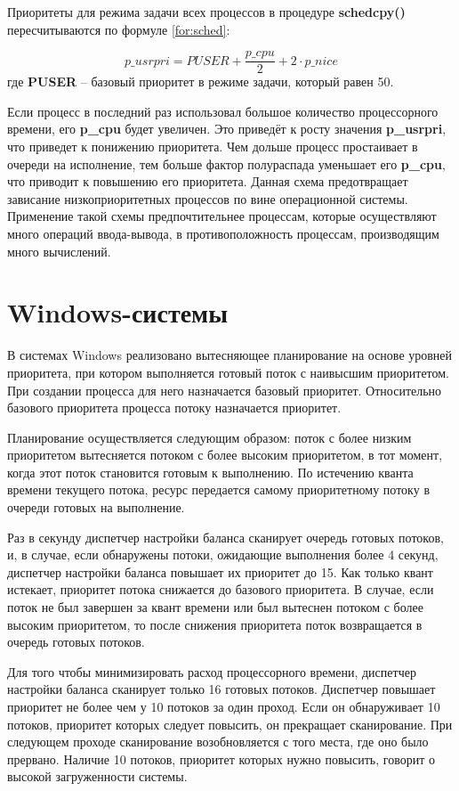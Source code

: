 \documentclass[a4paper,12pt]{extreport}
\begin{document}
Приоритеты для режима задачи всех процессов в процедуре \textbf{schedcpy()} пересчитываются по формуле \eqref{for:sched}:

\begin{equation}
	\label{for:sched}
	p\_usrpri = PUSER + \frac{p\_cpu}{2} + 2 \cdot p\_nice
\end{equation}
где \textbf{PUSER} -- базовый приоритет в режиме задачи, который равен 50.

Если процесс в последний раз использовал большое количество процессорного времени, его \textbf{p\_cpu} будет увеличен. Это приведёт к росту значения \textbf{p\_usrpri}, что приведет к понижению приоритета. Чем дольше процесс простаивает в очереди на исполнение, тем больше фактор полураспада уменьшает его \textbf{p\_cpu}, что приводит к повышению его приоритета. Данная схема предотвращает зависание низкоприоритетных процессов по вине операционной системы. Применение такой схемы предпочтительнее процессам, которые осуществляют много операций ввода-вывода, в противоположность процессам, производящим много вычислений.


\section{Windows-системы}

В системах Windows реализовано вытесняющее планирование на основе уровней приоритета, при котором выполняется готовый поток с наивысшим приоритетом. При создании процесса для него назначается базовый приоритет. Относительно базового приоритета процесса потоку назначается приоритет.

Планирование осуществляется следующим образом: поток с более низким приоритетом вытесняется потоком с более высоким приоритетом, в тот момент, когда этот поток становится готовым к выполнению. По истечению кванта времени текущего потока, ресурс передается самому приоритетному потоку в очереди готовых на выполнение.

Раз в секунду диспетчер настройки баланса сканирует очередь готовых потоков, и, в случае, если обнаружены потоки, ожидающие выполнения более 4 секунд, диспетчер настройки баланса повышает их приоритет до 15. Как только квант истекает, приоритет потока снижается до базового приоритета. В случае, если поток не был завершен за квант времени или был вытеснен потоком с более высоким приоритетом, то после снижения приоритета поток возвращается в очередь готовых потоков.

Для того чтобы минимизировать расход процессорного времени, диспетчер настройки баланса сканирует только 16 готовых потоков. Диспетчер повышает приоритет не более чем у 10 потоков за один проход. Если он обнаруживает 10 потоков, приоритет которых следует повысить, он прекращает сканирование. При следующем проходе сканирование возобновляется с того места, где оно было прервано. Наличие 10 потоков, приоритет которых нужно повысить, говорит о высокой загруженности системы.
\end{document}
